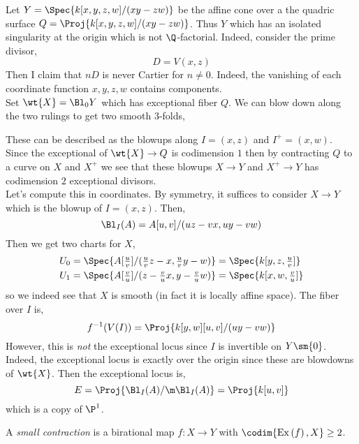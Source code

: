 \documentclass[12pt]{article}
\begin{document}
\begin{example}
Let $Y = \Spec{k[x,y,z,w]/(xy - zw)}$ be the affine cone over a the quadric surface $Q = \Proj{k[x,y,z,w]/(xy - zw)}$. Thus $Y$ which has an isolated singularity at the origin which is not $\Q$-factorial. Indeed, consider the prime divisor,
\[ D = V(x,z) \]
Then I claim that $n D$ is never Cartier for $n \neq 0$. Indeed, the vanishing of each coordinate function $x,y,z,w$ contains components.
\bigskip\\
Set $\wt{X} = \Bl_0 Y$ which has exceptional fiber $Q$. We can blow down along the two rulings to get two smooth $3$-folds,
\begin{center}
\end{center}
These can be described as the blowups along $I = (x,z)$ and $I^+ = (x,w)$. Since the exceptional of $\wt{X} \to Q$ is codimension $1$ then by contracting $Q$ to a curve on $X$ and $X^+$ we see that these blowups $X \to Y$ and $X^+ \to Y$ has codimension $2$ exceptional divisors.
\bigskip\\
Let's compute this in coordinates. By symmetry, it suffices to consider $X \to Y$ which is the blowup of $I = (x, z)$. Then,
\[ \Bl_I(A) = A[u,v]/(uz - vx, uy - vw) \]
Then we get two charts for $X$,
\begin{align*}
U_0 &= \Spec{A[\tfrac{u}{v}]/(\tfrac{u}{v} z - x, \tfrac{u}{v} y - w)} = \Spec{k[y,z,\tfrac{u}{v}]} \\
U_1 &= \Spec{A[\tfrac{v}{u}]/(z - \tfrac{v}{u} x, y - \tfrac{v}{u} w)} = \Spec{k[x,w,\tfrac{v}{u}]}
\end{align*}
so we indeed see that $X$ is smooth (in fact it is locally affine space). The fiber over $I$ is,
\[ f^{-1}(V(I)) = \Proj{k[y,w][u,v]/(uy - vw)} \]
However, this is \textit{not} the exceptional locus since $I$ is invertible on $Y \sm \{ 0 \}$. Indeed, the exceptional locus is exactly over the origin since these are blowdowns of $\wt{X}$. Then the exceptional locus is,
\[ E = \Proj{\Bl_I(A) / \m \Bl_I(A)} = \Proj{k[u,v]} \]
which is a copy of $\P^1$. 
\end{example}

\begin{defn}
A \textit{small contraction} is a birational map $f : X \to Y$ with $\codim{\Ex{f}, X} \ge 2$.
\end{defn}
\end{document}
